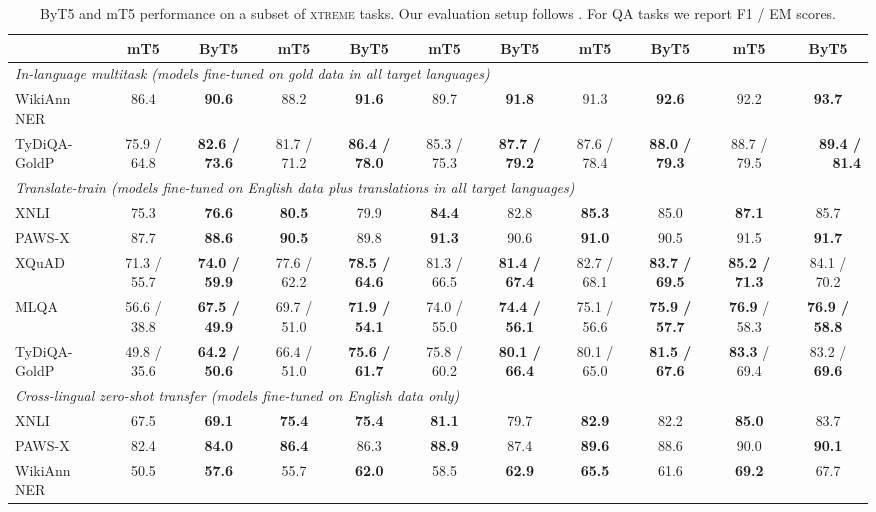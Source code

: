 \documentclass[11pt,a4paper]{article}
\begin{document}
\begin{table}[t!]
{\begin{tabular}{l cc cc cc cc cc}
 & mT5    & ByT5    & mT5    & ByT5   & mT5    & ByT5    & mT5   & ByT5  & mT5 & ByT5 \\
\midrule 
\multicolumn{11}{l}{\emph{In-language multitask (models fine-tuned on gold data in all target languages)}} \\
\midrule 
WikiAnn NER & 86.4 & \textbf{90.6} & 88.2 & \textbf{91.6} & 89.7 & \textbf{91.8} & 91.3 & \textbf{92.6} & 92.2 & \textbf{93.7} \\
TyDiQA-GoldP & 75.9 / 64.8 & \textbf{82.6 / 73.6} & 81.7 / 71.2 & \textbf{86.4 / 78.0} & 85.3 / 75.3 & \textbf{87.7 / 79.2} & 87.6 / 78.4 & \textbf{88.0 / 79.3} & 88.7 / 79.5 & \multicolumn{1}{r}{\textbf{89.4 / 81.4}} \\
\midrule 
\multicolumn{11}{l}{\emph{Translate-train (models fine-tuned on English data plus translations in all target languages)}} \\
\midrule 
XNLI & 75.3 & \textbf{76.6} & \textbf{80.5} & 79.9 & \textbf{84.4} & 82.8 & \textbf{85.3} & 85.0 & \textbf{87.1} & 85.7 \\
PAWS-X & 87.7 & \textbf{88.6} & \textbf{90.5} & 89.8 & \textbf{91.3} & 90.6 & \textbf{91.0} & 90.5 & 91.5 & \textbf{91.7} \\
XQuAD & 71.3 / 55.7 & \textbf{74.0 / 59.9} & 77.6 / 62.2 & \textbf{78.5 / 64.6} & 81.3 / 66.5 & \textbf{81.4 / 67.4} & 82.7 / 68.1 & \textbf{83.7 / 69.5} & \textbf{85.2 / 71.3} & 84.1 / 70.2 \\
MLQA &	56.6 / 38.8	 & \textbf{67.5 / 49.9} & 	69.7 / 51.0	 & \textbf{71.9 / 54.1} & 	74.0 / 55.0	 & \textbf{74.4 / 56.1} & 	75.1 / 56.6	 & \textbf{75.9 / 57.7} & 	\textbf{76.9} / 58.3	 & \textbf{76.9 / 58.8}	\\										
TyDiQA-GoldP & 49.8 / 35.6 & \textbf{64.2 / 50.6} & 66.4 / 51.0 & \textbf{75.6 / 61.7} & 75.8 / 60.2 & \textbf{80.1 / 66.4} & 80.1 / 65.0 & \textbf{81.5 / 67.6} & \textbf{83.3} / 69.4 & 83.2 / \textbf{69.6} \\
\midrule 
\multicolumn{11}{l}{\emph{Cross-lingual zero-shot transfer (models fine-tuned on English data only)}} \\
\midrule 
XNLI   & 67.5        & \textbf{69.1}        & \textbf{75.4}                 & \textbf{75.4}        & \textbf{81.1}        & 79.7        & \textbf{82.9}        & 82.2        & \textbf{85.0}        & 83.7          \\
PAWS-X  & 82.4        & \textbf{84.0}          & \textbf{86.4}                 & 86.3                 & \textbf{88.9}        & 87.4        & \textbf{89.6}        & 88.6        & 90.0                 & \textbf{90.1} \\
WikiAnn NER & 50.5        & \textbf{57.6} & 55.7        & \textbf{62.0} & 58.5        & \textbf{62.9} & \textbf{65.5} & 61.6        & \textbf{69.2} & 67.7 \\
\bottomrule
\end{tabular}
}
\caption{ByT5 and mT5 performance on a subset of \textsc{xtreme} tasks. Our evaluation setup follows \citet{mt5}. For QA tasks we report F1 / EM scores.}
\label{tab:xtreme}
\end{table}
\end{document}
